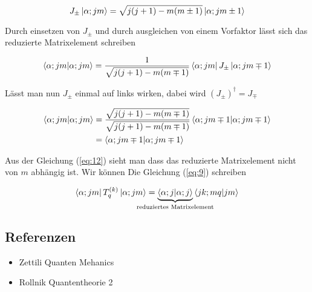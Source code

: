 \begin{equation}
  \label{eq:11}
  J_{\pm}\left| \alpha; jm \right\rangle = \sqrt{j(j+1)-m(m\pm 1)} \left| \alpha; jm\pm 1 \right\rangle
\end{equation}

Durch einsetzen von \(J_{\pm}\) und durch ausgleichen von einem Vorfaktor lässt sich das reduzierte Matrixelement schreiben


\begin{align}
  \label{eq:10}
  \braket{\alpha;jm}{\alpha; jm} = \frac{1}{\sqrt{j(j+1)-m(m\mp 1)}}  \bra{\alpha;jm}J_{\pm} \ket{\alpha; jm\mp 1}
\end{align}

Lässt man nun \(J_{\pm}\) einmal auf links wirken, dabei wird \((J_{\pm})^\dagger = J_{\mp}\)

\begin{align}
  \label{eq:12}
  \braket{\alpha;jm}{\alpha; jm} &= \frac{\sqrt{j(j+1)-m(m\mp 1)}}{\sqrt{j(j+1)-m(m\mp 1)}}  \braket{\alpha;jm\mp 1 }{\alpha; jm\mp 1} \notag \\
&= \braket{\alpha;jm\mp 1 }{\alpha; jm\mp 1}
\end{align}

Aus der Gleichung (\ref{eq:12}) sieht man dass das reduzierte Matrixelement nicht von \(m\) abhängig ist. Wir können Die Gleichung (\ref{eq:9}) schreiben

\begin{equation}
  \label{eq:14}
   \bra{\alpha;jm} T^{(k)}_q  \ket{\alpha;jm} =  \underbr{\braket{\alpha;j}{\alpha; j}}_{\text{reduziertes Matrixelement}}   \braket{jk;mq}{jm}
\end{equation}






\subsection*{Referenzen}
\begin{itemize}
\item Zettili Quanten Mehanics
\item Rollnik Quantentheorie 2
\end{itemize}


